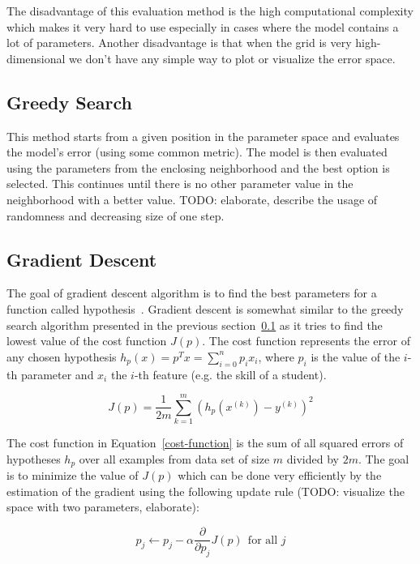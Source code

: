 The disadvantage of this evaluation method is the high computational complexity which makes it very hard to use especially in cases where the model contains a lot of parameters. Another disadvantage is that when the grid is very high-dimensional we don't have any simple way to plot or visualize the error space.

\subsection{Greedy Search}
\label{greedy-search}

This method starts from a given position in the parameter space and evaluates the model's error (using some common metric). The model is then evaluated using the parameters from the enclosing neighborhood and the best option is selected. This continues until there is no other parameter value in the neighborhood with a better value. TODO: elaborate, describe the usage of randomness and decreasing size of one step.

\subsection{Gradient Descent}

The goal of gradient descent algorithm is to find the best parameters for a function called hypothesis~\cite{Klusasek2014}. Gradient descent is somewhat similar to the greedy search algorithm presented in the previous section~\ref{greedy-search} as it tries to find the lowest value of the cost function $J(p)$. The cost function represents the error of any chosen hypothesis $h_{p}(x) = p^T x = \sum^n_{i=0} p_i x_i$, where $p_i$ is the value of the $i$-th parameter and $x_i$ the $i$-th feature (e.g. the skill of a student).

\begin{equation} \label{cost-function}
  J(p) = \frac{1}{2m} \sum^m_{k=1} (h_p(x^{(k)}) - y^{(k)})^2
\end{equation}

The cost function in Equation~\ref{cost-function} is the sum of all squared errors of hypotheses $h_p$ over all examples from data set of size $m$ divided by $2m$. The goal is to minimize the value of $J(p)$ which can be done very efficiently by the estimation of the gradient using the following update rule (TODO: visualize the space with two parameters, elaborate):

\begin{equation} \label{cost-function-update}
  p_j \gets p_j - \alpha \frac{\partial}{\partial p_j} J(p)~~\text{for all } j
\end{equation}

